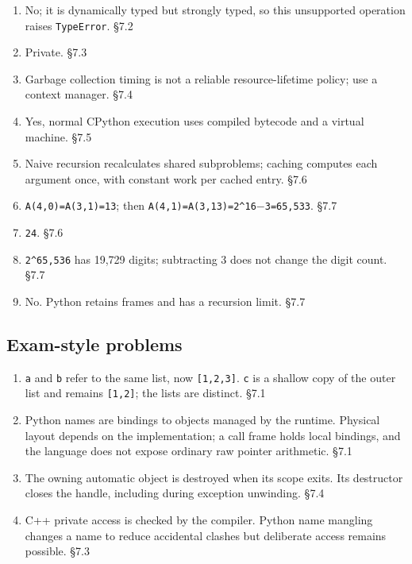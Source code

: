 \documentclass[11pt]{article}
\begin{document}
\begin{keepsection}
\begin{enumerate}
\item No; it is dynamically typed but strongly typed, so this unsupported operation raises \texttt{TypeError}. \hfill{\small\color{FAUblue}§7.2}
\item Private. \hfill{\small\color{FAUblue}§7.3}
\item Garbage collection timing is not a reliable resource-lifetime policy; use a context manager. \hfill{\small\color{FAUblue}§7.4}
\item Yes, normal CPython execution uses compiled bytecode and a virtual machine. \hfill{\small\color{FAUblue}§7.5}
\item Naive recursion recalculates shared subproblems; caching computes each argument once, with constant work per cached entry. \hfill{\small\color{FAUblue}§7.6}
\item \texttt{A(4,0)=A(3,1)=13}; then \texttt{A(4,1)=A(3,13)=2\textasciicircum{}16\ensuremath{-}3=65,533}. \hfill{\small\color{FAUblue}§7.7}
\item \texttt{24}. \hfill{\small\color{FAUblue}§7.6}
\item \texttt{2\textasciicircum{}65,536} has 19,729 digits; subtracting 3 does not change the digit count. \hfill{\small\color{FAUblue}§7.7}
\item No. Python retains frames and has a recursion limit. \hfill{\small\color{FAUblue}§7.7}
\end{enumerate}

\end{keepsection}
\begin{keepsection}\subsection{Exam-style problems}

\begin{enumerate}
\item \texttt{a} and \texttt{b} refer to the same list, now \texttt{[1,2,3]}. \texttt{c} is a shallow copy of the outer list and remains \texttt{[1,2]}; the lists are distinct. \hfill{\small\color{FAUblue}§7.1}
\item Python names are bindings to objects managed by the runtime. Physical layout depends on the implementation; a call frame holds local bindings, and the language does not expose ordinary raw pointer arithmetic. \hfill{\small\color{FAUblue}§7.1}
\item The owning automatic object is destroyed when its scope exits. Its destructor closes the handle, including during exception unwinding. \hfill{\small\color{FAUblue}§7.4}
\item C++ private access is checked by the compiler. Python name mangling changes a name to reduce accidental clashes but deliberate access remains possible. \hfill{\small\color{FAUblue}§7.3}
\end{enumerate}

\end{keepsection}
\end{document}
